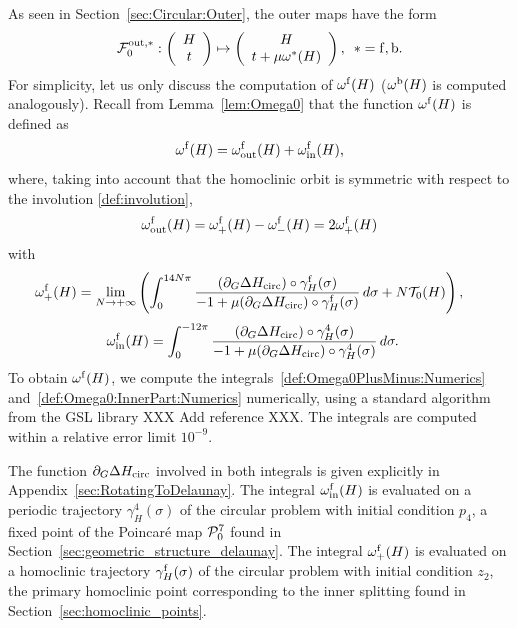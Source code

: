 As seen in Section~\ref{sec:Circular:Outer}, the outer maps have the
form
\begin{equation}\label{def:OuterMap:Circular:Numerics}
  \mathcal{F}_0^{\mathrm{out},\ast}:\left(\begin{array}{c} H\\
      t
    \end{array}\right)\mapsto \left(\begin{array}{c} H\\
      t+\mu\omega^\ast(H)
    \end{array}\right),\,\,\,\ast=\mathrm{f},\mathrm{b}.
\end{equation}
For simplicity, let us only discuss the computation of $\omega^{\mathrm{f}}(H)$
($\omega^{\mathrm{b}}(H)$ is computed analogously).
Recall from Lemma~\ref{lem:Omega0} that the function $\omega^{\mathrm{f}}(H)$
is defined as
  \[
  \omega^{\mathrm{f}}(H)= \omega^{\mathrm{f}}_{\mathrm{out}}(H)+\omega_{\mathrm{in}}^{\mathrm{f}} (H),
  \]
where, taking into account that the homoclinic orbit is symmetric with respect to the involution \eqref{def:involution},
\begin{equation}\label{def:Omega0:OuterPart:Numerics}
 \omega^{\mathrm{f}}_{\mathrm{out}}(H)=\omega_+^{\mathrm{f}}(H)-\omega^{\mathrm{f}}_-(H) = 2\omega_+^{\mathrm{f}}(H)
\end{equation}
  with
  \begin{equation}\label{def:Omega0PlusMinus:Numerics}
 \begin{split}  
 \omega_+^{\mathrm{f}}(H)&=\lim_{N\rightarrow+\infty}\left(\int_0^{ 14N\pi
      }\frac{(\partial_G\Delta
        H_{\mathrm{circ}}) \circ \gamma_H^{\mathrm{f}}(\sigma)}{-1+\mu(\partial_G\Delta
        H_{\mathrm{circ}}) \circ \gamma_H^{\mathrm{f}}(\sigma)} \,
d\sigma+N\mathcal{T}_0(H)\right),\,\,\,
\end{split}  
\end{equation}
\begin{equation}\label{def:Omega0:InnerPart:Numerics}
\begin{split}
 \omega_{\mathrm{in}}^{\mathrm{f}}(H)&=\int_0^{ -12\pi
      }\frac{(\partial_G\Delta
        H_{\mathrm{circ}}) \circ \gamma_H^4(\sigma)}{-1+\mu(\partial_G\Delta
        H_{\mathrm{circ}}) \circ \gamma_H^4(\sigma)} \, d\sigma.
\end{split}
\end{equation}
To obtain $\omega^{\mathrm{f}}(H)$, we compute the
integrals~\eqref{def:Omega0PlusMinus:Numerics}
and~\eqref{def:Omega0:InnerPart:Numerics} numerically, using a standard
algorithm from the GSL library XXX Add reference XXX.
The integrals are computed within a relative error limit $10^{-9}$.

The function $\partial_G\Delta H_{\mathrm{circ}}$ involved in both integrals is
given explicitly in Appendix~\ref{sec:RotatingToDelaunay}.
The integral $\omega_{\mathrm{in}}^{\mathrm{f}}(H)$ is evaluated on a periodic
trajectory $\gamma_H^4(\sigma)$ of the circular problem with initial
condition $p_4$, a fixed point of the Poincar\'e map $\mathcal{P}_0^7$
found in Section~\ref{sec:geometric_structure_delaunay}.
The integral $\omega_+^{\mathrm{f}}(H)$ is evaluated on a homoclinic trajectory
$\gamma_H^{\mathrm{f}}(\sigma)$ of the circular problem with initial condition
$z_2$, the primary homoclinic point corresponding to the inner
splitting found in Section~\ref{sec:homoclinic_points}.


